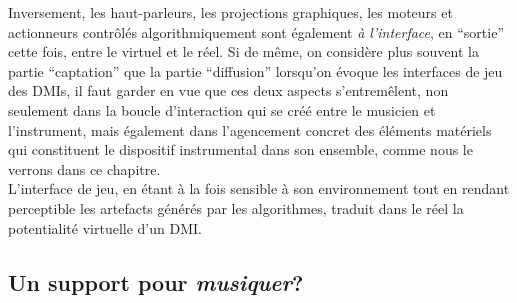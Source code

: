 \indent Inversement, les haut-parleurs, les projections graphiques, les moteurs et actionneurs contrôlés algorithmiquement sont également \textit{à l'interface}, en ``sortie'' cette fois, entre le virtuel et le réel. Si de même, on considère plus souvent la partie ``captation'' que la partie ``diffusion'' lorsqu'on évoque les interfaces de jeu des \glspl{DMI}, il faut garder en vue que ces deux aspects s'entremêlent, non seulement dans la boucle d'interaction qui se créé entre le musicien et l'instrument, mais également dans l'agencement concret des éléments matériels qui constituent le dispositif instrumental dans son ensemble, comme nous le verrons dans ce chapitre.\\
\indent L'interface de jeu, en étant à la fois sensible à son environnement tout en rendant perceptible les artefacts générés par les algorithmes, traduit dans le réel la potentialité virtuelle d'un \gls{DMI}.


\subsection{Un support pour \textit{musiquer}?}

